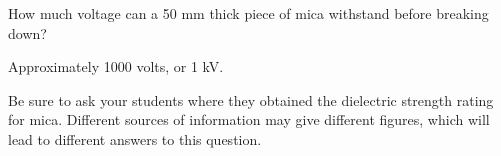 

How much voltage can a 50 mm thick piece of mica withstand before breaking down?







Approximately 1000 volts, or 1 kV.







Be sure to ask your students where they obtained the dielectric strength rating for mica.  Different sources of information may give different figures, which will lead to different answers to this question.




